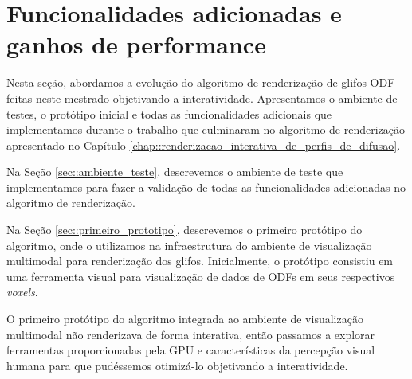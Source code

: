 \documentclass[
    12pt,                %
    oneside,            %
    a4paper,            %
    english,            %
    french,                %
    spanish,            %
    brazil                %
    ]{abntex2}
\begin{document}





\section{Funcionalidades adicionadas e ganhos de performance}
\label{chap::renderizacao_de_perfis_de_difusao}

Nesta seção, abordamos a evolução do algoritmo de renderização de glifos ODF feitas neste mestrado objetivando a interatividade. Apresentamos o ambiente de testes, o protótipo inicial e todas as funcionalidades adicionais que implementamos durante o trabalho que culminaram no algoritmo de renderização apresentado no Capítulo \ref{chap::renderizacao_interativa_de_perfis_de_difusao}.

Na Seção \ref{sec::ambiente_teste}, descrevemos o ambiente de teste que implementamos para fazer a validação  de todas as funcionalidades adicionadas no algoritmo de renderização.


Na Seção \ref{sec::primeiro_prototipo}, descrevemos o primeiro protótipo do algoritmo, onde o utilizamos na infraestrutura do ambiente de visualização multimodal para renderização dos glifos. Inicialmente, o protótipo consistiu em uma ferramenta visual para visualização de dados de ODFs em seus respectivos \textit{voxels}.

O primeiro protótipo do algoritmo integrada ao ambiente de visualização multimodal não renderizava de forma interativa, então passamos a explorar ferramentas proporcionadas pela GPU e características da percepção visual humana para que pudéssemos otimizá-lo objetivando a interatividade.
\end{document}
